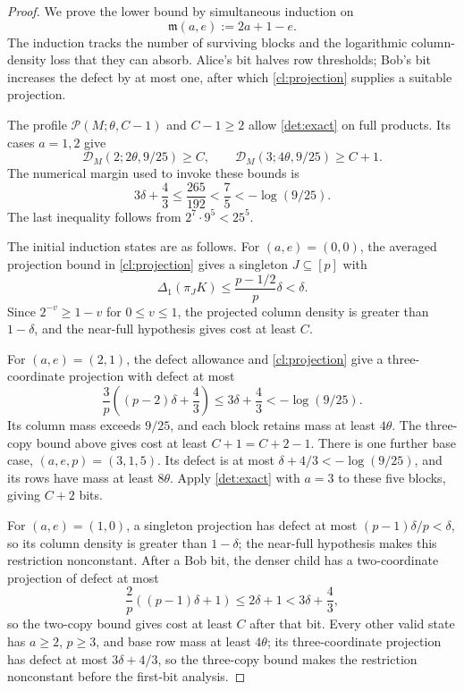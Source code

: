 \documentclass[11pt]{article} \usepackage[utf8]{inputenc}
\theoremstyle{plain} \newtheorem{theorem}{Theorem}[section]
\theoremstyle{definition} \newaliascnt{definition}{theorem}
\newcommand{\RP}[3]{\mathcal{P}(#1;#2,#3)}
\begin{document}
\begin{proof}
We prove the lower bound by simultaneous induction on
\[
\mathfrak m(a,e):=2a+1-e.
\]
The induction tracks the number of surviving blocks and the logarithmic
column-density loss that they can absorb. Alice's bit halves row thresholds;
Bob's bit increases the defect by at most one, after which \cref{cl:projection}
supplies a suitable projection.

The profile $\RP{M}{\theta}{C-1}$ and $C-1\ge2$ allow
\cref{det:exact} on full products. Its cases $a=1,2$ give
\[
\mathcal D_M(2;2\theta,9/25)\ge C,\qquad
\mathcal D_M(3;4\theta,9/25)\ge C+1.
\]
The numerical margin used to invoke these bounds is
\[
3\delta+\frac43\le\frac{265}{192}<\frac75<-\log(9/25).
\]
The last inequality follows from \(2^7\cdot9^5<25^5\).

The initial induction states are as follows. For \((a,e)=(0,0)\), the averaged
projection bound in \cref{cl:projection} gives a singleton \(J\subseteq[p]\)
with
\[
\Delta_1(\pi_JK)\le\frac{p-1/2}{p}\delta<\delta.
\]
Since \(2^{-v}\ge1-v\) for \(0\le v\le1\), the projected column density is
greater than \(1-\delta\), and the near-full hypothesis gives cost at least
\(C\).

For \((a,e)=(2,1)\), the defect allowance and \cref{cl:projection} give a
three-coordinate projection with defect at most
\[
\frac3p\left((p-2)\delta+\frac43\right)
\le3\delta+\frac43<-\log(9/25).
\]
Its column mass exceeds \(9/25\), and each block retains mass at least
\(4\theta\). The three-copy bound above gives cost at least
\(C+1=C+2-1\).
There is one further base case, \((a,e,p)=(3,1,5)\). Its defect is at most
\(\delta+4/3<-\log(9/25)\), and its rows have mass at least \(8\theta\).
Apply \cref{det:exact} with $a=3$ to these five blocks, giving $C+2$ bits.

For \((a,e)=(1,0)\), a singleton projection has defect at most
\((p-1)\delta/p<\delta\), so its column density is greater than \(1-\delta\);
the near-full hypothesis makes this restriction nonconstant. After a Bob bit,
the denser child has a two-coordinate projection of defect at most
\[
\frac2p\left((p-1)\delta+1\right) \le2\delta+1<3\delta+\frac43,
\]
so the two-copy bound gives cost at least \(C\) after that bit. Every other
valid state has \(a\ge2\), \(p\ge3\), and base row mass at least \(4\theta\); its
three-coordinate projection has defect at most \(3\delta+4/3\), so the
three-copy bound makes the restriction nonconstant before the first-bit
analysis.


\end{proof}
\end{document}
